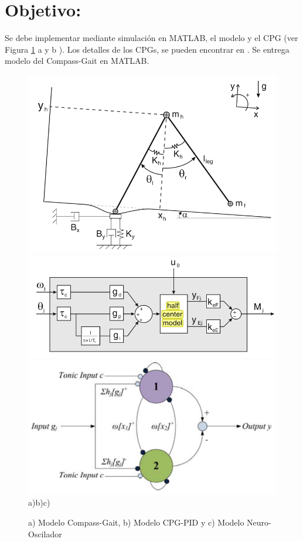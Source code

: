 \documentclass[10pt,onecolumn,twoside,letterpaper]{article}
\begin{document}
\section{Objetivo:}
Se debe implementar mediante simulaci\'on en MATLAB, el modelo y el CPG (ver Figura \ref{fig:modelos} a y b ). Los detalles de los CPGs, se pueden encontrar en \cite{Kim2009}. Se entrega modelo del Compass-Gait en MATLAB.
\begin{figure}[!ht]
  \centering
  \includegraphics[scale=0.2]{../../images/VerdaasdonkCompassGaitModel.png}
  \includegraphics[scale=0.2]{../../images/VerdaasdonkCPGmodel.png}
  \includegraphics[scale=0.2]{../../images/KimNeuralOscillatorModel.png}\\a)\hspace{5cm}b)\hspace{4cm}c)
  \caption{\small a) Modelo Compass-Gait\protect, b) Modelo CPG-PID\protect\cite{Verdaasdonk2009} y c) Modelo Neuro-Oscilador\protect\cite{Kim2009}}
  \label{fig:modelos}
\end{figure}

\end{document}
